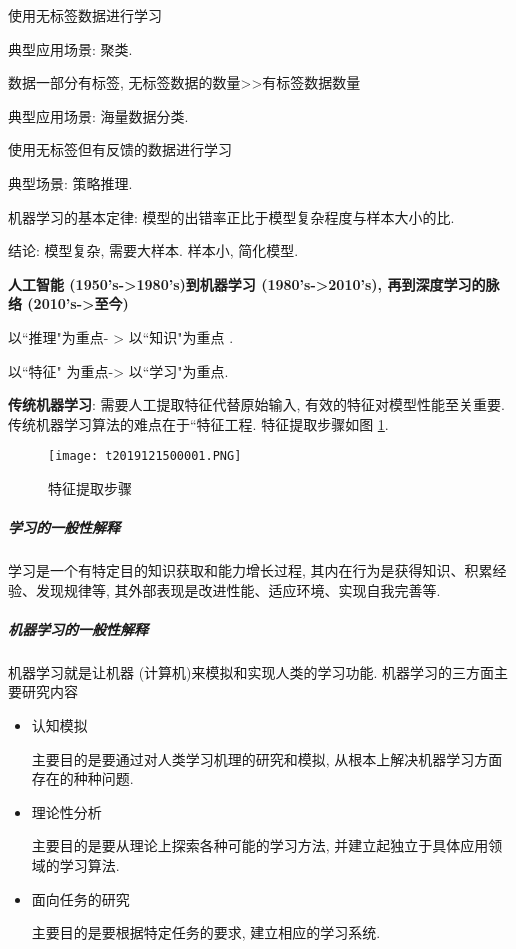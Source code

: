 \begin{tcolorbox}[colback=white!50,colframe=orange!50,title=非监督学习 ( Unsupervised learning)]
使用无标签数据进行学习

典型应用场景: 聚类.
\end{tcolorbox}

\begin{tcolorbox}[colback=white!50,colframe=orange!50,title=半监督学习 ( Semi-supervised learning)]
数据一部分有标签, 无标签数据的数量>>有标签数据数量

典型应用场景: 海量数据分类.
\end{tcolorbox}

\begin{tcolorbox}[colback=white!50,colframe=orange!50,title=强化学习 ( Reinforcement learning)]
使用无标签但有反馈的数据进行学习

典型场景: 策略推理.
\end{tcolorbox}

机器学习的基本定律: 模型的出错率正比于模型复杂程度与样本大小的比.

结论:  模型复杂, 需要大样本. 样本小, 简化模型.

\textbf{人工智能 (1950's->1980's)到机器学习 (1980's->2010's), 再到深度学习的脉络 (2010's->至今)}
\begin{center}
以“推理"为重点- > 以“知识"为重点 .

以“特征" 为重点-> 以“学习"为重点.
\end{center}

\textbf{传统机器学习}:  需要人工提取特征代替原始输入, 有效的特征对模型性能至关重要. 传统机器学习算法的难点在于“特征工程. 特征提取步骤如图 \ref{AI32fig2019121501}.
\begin{figure}[H]
\centering
\texttt{[image: t2019121500001.PNG]}
\caption{特征提取步骤}
\label{AI32fig2019121501}
\end{figure}
\subparagraph{学习的一般性解释}
学习是一个有特定目的知识获取和能力增长过程, 其内在行为是获得知识、积累经验、发现规律等, 其外部表现是改进性能、适应环境、实现自我完善等.
\subparagraph{机器学习的一般性解释}
机器学习就是让机器 (计算机)来模拟和实现人类的学习功能.
机器学习的三方面主要研究内容
\begin{itemize}
\item 认知模拟

    主要目的是要通过对人类学习机理的研究和模拟, 从根本上解决机器学习方面存在的种种问题.
\item 理论性分析

     主要目的是要从理论上探索各种可能的学习方法, 并建立起独立于具体应用领域的学习算法.
\item 面向任务的研究

    主要目的是要根据特定任务的要求, 建立相应的学习系统.
\end{itemize}

